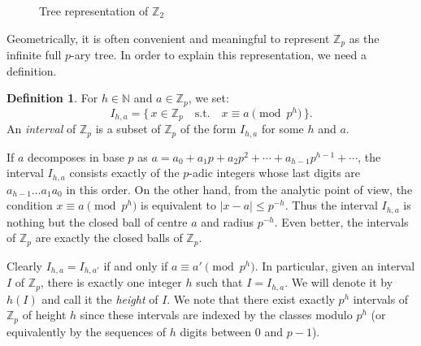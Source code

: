 \documentclass[11pt]{article}
\numberwithin{equation}{section}
\numberwithin{figure}{section}
\renewcommand{\leq}{\leqslant}
\theoremstyle{definition}
\newtheorem{deftn}[theo]{Definition}
\newcommand{\N}{\mathbb N}
\newcommand{\Z}{\mathbb Z}
\newcommand{\Zp}{\Z_p}
\begin{document}
\begin{figure}
\hfill\null

\caption{Tree representation of $\Z_2$}
\label{fig:treeZ2}
\end{figure}

Geometrically, it is often convenient and meaningful to represent $\Zp$ 
as the infinite full $p$-ary tree. In order to explain this 
representation, we need a definition.

\begin{deftn}
\label{def:intervalZp}
For $h \in \N$ and $a \in\Zp$, we set:
$$I_{h,a} = \big\{ \, x \in \Zp 
\quad \text{s.t.} \quad 
x \equiv a \pmod{p^h} \, \big\}.$$
An \emph{interval} of $\Zp$ is a subset of $\Zp$ of the form $I_{h,a}$
for some $h$ and $a$.
\end{deftn}

If $a$ decomposes in base $p$ as
$a = a_0 + a_1 p + a_2 p^2 + \cdots + a_{h-1} p^{h-1} + \cdots$,
the interval $I_{h,a}$ consists exactly of the $p$-adic integers whose
last digits are $a_{h-1} \ldots a_1 a_0$ in this order.
On the other hand, from the analytic point of view, the condition $x 
\equiv a \pmod {p^h}$ is equivalent to $|x-a| \leq p^{-h}$. Thus the
interval $I_{h,a}$ is nothing but the closed ball of centre $a$ and 
radius $p^{-h}$. Even better, the intervals of $\Zp$ are exactly the 
closed balls of $\Zp$.

Clearly $I_{h,a} = I_{h,a'}$ if and only if $a \equiv a' \pmod{p^h}$. 
In particular, given an interval $I$ of $\Zp$, there is exactly one
integer $h$ such that $I = I_{h,a}$. We will denote it by $h(I)$ and
call it the \emph{height} of $I$. We note that there exist exactly
$p^h$ intervals of $\Zp$ of height $h$ since these intervals are
indexed by the classes modulo $p^h$ (or equivalently by the sequences
of $h$ digits between $0$ and $p{-}1$).
\end{document}
